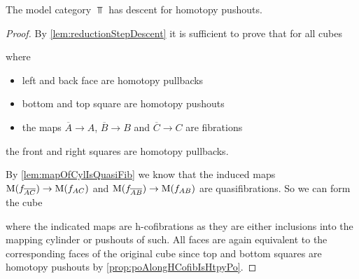 \begin{prop}\label{lem:topDescentPoAlt}
    The model category $\Top$ has descent for homotopy pushouts. 
    \begin{proof}
        By \cref{lem:reductionStepDescent} it is sufficient to prove that for all cubes 
        \begin{center}
        \end{center}
        where 
        \begin{itemize}
            \item left and back face are homotopy pullbacks
            \item bottom and top square are homotopy pushouts
            \item the maps $\overline{A}\to A$, $\overline{B}\to B$ and $\overline{C}\to C$ are fibrations
        \end{itemize}
        the front and right squares are homotopy pullbacks.

        By \cref{lem:mapOfCylIsQuasiFib} we know that the induced maps $\operatorname{M}(f_{\overline{A}\overline{C}})\to\operatorname{M}(f_{AC})$ and $\operatorname{M}(f_{\overline{A}\overline{B}})\to\operatorname{M}(f_{AB})$ are quasifibrations.
        So we can form the cube 
        \begin{center}
        \end{center}
        where the indicated maps are h-cofibrations as they are either inclusions into the mapping cylinder or pushouts of such.
        All faces are again equivalent to the corresponding faces of the original cube since top and bottom squares are homotopy pushouts by \cref{prop:poAlongHCofibIsHtpyPo}.
        

\end{proof}
\end{prop}
